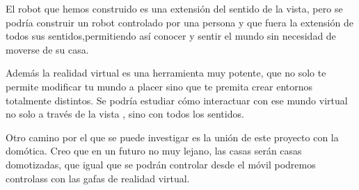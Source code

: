 \documentclass[twoside, 11pt]{epstfg}
\begin{document}
El robot que hemos construido es una extensión del sentido de la vista, pero se podría construir un robot controlado por una persona y que fuera la extensión de todos sus sentidos,permitiendo así conocer y sentir el mundo sin necesidad de moverse de su casa.

Además la realidad virtual es una herramienta muy potente, que no solo te permite modificar tu mundo a placer sino que te premita crear entornos totalmente distintos. Se podría estudiar cómo interactuar con ese mundo virtual no solo a través de la vista , sino con todos los sentidos.

Otro camino por el que se puede investigar es la unión de este proyecto con la domótica.
Creo que en un futuro no muy lejano, las casas serán casas domotizadas, que igual que se podrán controlar desde el móvil podremos controlass con las gafas de realidad virtual.

\backmatter
\appendix

\cleardoublepage

\nocite{*}
{}

\cleardoublepage
\printindex
\end{document}
